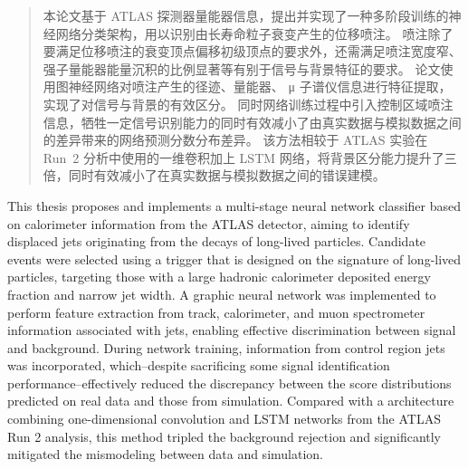 

\begin{abstract}
  本论文基于 ATLAS 探测器量能器信息，提出并实现了一种多阶段训练的神经网络分类架构，用以识别由长寿命粒子衰变产生的位移喷注。
  喷注除了要满足位移喷注的衰变顶点偏移初级顶点的要求外，还需满足喷注宽度窄、强子量能器能量沉积的比例显著等有别于信号与背景特征的要求。
  论文使用图神经网络对喷注产生的径迹、量能器、 μ 子谱仪信息进行特征提取，实现了对信号与背景的有效区分。
  同时网络训练过程中引入控制区域喷注信息，牺牲一定信号识别能力的同时有效减小了由真实数据与模拟数据之间的差异带来的网络预测分数分布差异。
  该方法相较于 ATLAS 实验在 Run~2 分析中使用的一维卷积加上 LSTM 网络，将背景区分能力提升了三倍，同时有效减小了在真实数据与模拟数据之间的错误建模。
\end{abstract}

\begin{abstract*}
  This thesis proposes and implements a multi-stage neural network classifier based on calorimeter information from the ATLAS detector,
  aiming to identify displaced jets originating from the decays of long-lived particles.
  Candidate events were selected using a trigger that is designed on the signature of long-lived particles,
  targeting those with a large hadronic calorimeter deposited energy fraction and narrow jet width.
  A graphic neural network was implemented to perform feature extraction from track, calorimeter,
  and muon spectrometer information associated with jets, enabling effective discrimination between signal and background.
  During network training, information from control region jets was incorporated,
  which--despite sacrificing some signal identification performance--effectively reduced the discrepancy
  between the score distributions predicted on real data and those from simulation.
  Compared with a architecture combining one-dimensional convolution and LSTM networks from the ATLAS Run 2 analysis,
  this method tripled the background rejection and significantly mitigated the mismodeling between data and simulation.
\end{abstract*}
